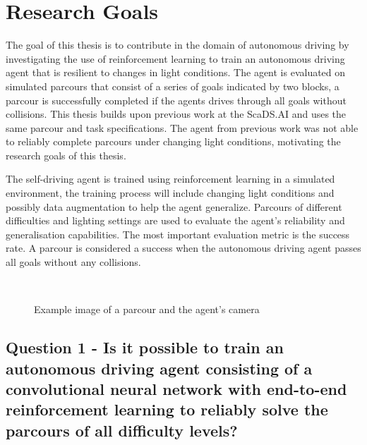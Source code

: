\chapter{Research Goals}
\label{cha:Research Goals}

The goal of this thesis is to contribute in the domain of autonomous driving by investigating the use of reinforcement learning to train an autonomous driving agent that is resilient to changes in light conditions. The agent is evaluated on  simulated parcours that consist of a series of goals indicated by two blocks, a parcour is successfully completed if the agents drives through all goals without collisions.
This thesis builds upon previous work at the ScaDS.AI \autocite{maximilian} and uses the same parcour and task specifications. The agent from previous work was not able to reliably complete parcours under changing light conditions, motivating the research goals of this thesis.


The self-driving agent is trained using reinforcement learning in a simulated environment, the training process will include changing light conditions and possibly data augmentation to help the agent generalize.
Parcours of different difficulties and lighting settings are used to evaluate the agent's reliability and generalisation capabilities. The most important evaluation metric is the success rate. A parcour is considered a success when the autonomous driving agent passes all goals without any collisions.


\begin{figure}
    \centering
    \qquad
    \\
    \caption{Example image of a parcour and the agent's camera}
\end{figure}


\section{Question 1 - Is it possible to train an autonomous driving agent consisting of a convolutional neural network with end-to-end reinforcement learning to reliably solve the parcours of all difficulty levels?}

